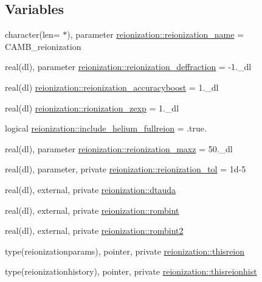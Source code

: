 \subsection*{Variables}
\begin{DoxyCompactItemize}
\item 
character(len= $\ast$), parameter \mbox{\hyperlink{namespacereionization_a0f6786ae38db76cf41888ab5184a33e3}{reionization\+::reionization\+\_\+name}} = \textquotesingle{}C\+A\+M\+B\+\_\+reionization\textquotesingle{}
\item 
real(dl), parameter \mbox{\hyperlink{namespacereionization_a524cb51bf4f9b20d0d3e3be38d351411}{reionization\+::reionization\+\_\+deffraction}} = -\/1.\+\_\+dl
\item 
real(dl) \mbox{\hyperlink{namespacereionization_a277cddc498b57445702ef3b7301c1a0d}{reionization\+::reionization\+\_\+accuracyboost}} = 1.\+\_\+dl
\item 
real(dl) \mbox{\hyperlink{namespacereionization_a55530d3d422131a11f47a02e17e4aba3}{reionization\+::rionization\+\_\+zexp}} = 1.\+\_\+dl
\item 
logical \mbox{\hyperlink{namespacereionization_abef718177b8ea5ca6c7ee8d1c78e60c6}{reionization\+::include\+\_\+helium\+\_\+fullreion}} = .true.
\item 
real(dl), parameter \mbox{\hyperlink{namespacereionization_a5631e22e02e0694f1813b80cdd6004c1}{reionization\+::reionization\+\_\+maxz}} = 50.\+\_\+dl
\item 
real(dl), parameter, private \mbox{\hyperlink{namespacereionization_a4d46e2413c850ed23c74c3808d8ac06b}{reionization\+::reionization\+\_\+tol}} = 1d-\/5
\item 
real(dl), external, private \mbox{\hyperlink{namespacereionization_a51d090041c100fe2820d487b4f95146d}{reionization\+::dtauda}}
\item 
real(dl), external, private \mbox{\hyperlink{namespacereionization_adb3b9c977f29d4636fa9cf724efd5979}{reionization\+::rombint}}
\item 
real(dl), external, private \mbox{\hyperlink{namespacereionization_a415cf31bf0d6b1564808bbf7ee0b2c85}{reionization\+::rombint2}}
\item 
type(reionizationparams), pointer, private \mbox{\hyperlink{namespacereionization_a3cd065cf1b3c5c33363c2d7e5d2443ba}{reionization\+::thisreion}}
\item 
type(reionizationhistory), pointer, private \mbox{\hyperlink{namespacereionization_afc2b645c62db796865419a767ad68a98}{reionization\+::thisreionhist}}
\end{DoxyCompactItemize}
